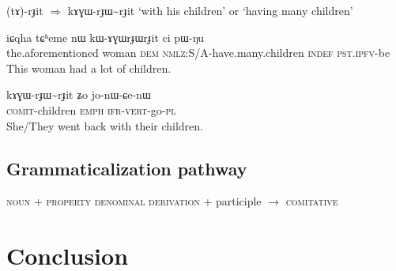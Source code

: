 \documentclass[oldfontcommands,oneside,a4paper,11pt]{article}
\newcommand{\ipa}[1]{{\phon #1}} %
\newcommand{\tld}{\textasciitilde{}}
\begin{document}
 \ipa{(tɤ)-rɟit} $\Rightarrow$ \ipa{kɤɣɯ-rɟɯ\textasciitilde{}rɟit} `with his children' or `having many children'
\begin{exe}
\ex
\gll   
\ipa{iɕqha} 	\ipa{tɕʰeme} 	\ipa{nɯ} 	\ipa{kɯ-ɤɣɯrɟɯrɟit} 	\ipa{ci} 	\ipa{pɯ-ŋu}  \\
the.aforementioned woman \textsc{dem} \textsc{nmlz}:S/A-have.many.children \textsc{indef} \textsc{pst.ipfv}-be \\
\glt This woman had a lot of children.
\end{exe}

\begin{exe}
\ex
\gll   
\ipa{kɤɣɯ-rɟɯ\tld{}rɟit} 	\ipa{ʑo} 	\ipa{jo-nɯ-ɕe-nɯ} \\
\textsc{comit}-children \textsc{emph} \textsc{ifr-vert}-go-\textsc{pl} \\
\glt She/They went back with their children.
\end{exe}
  

\subsection{Grammaticalization pathway}
 \begin{exe}
\ex
 \glt  \textsc{noun} + \textsc{property denominal derivation} + participle $\rightarrow$ \textsc{comitative}
\end{exe} 
\section{Conclusion} 



\end{document}
